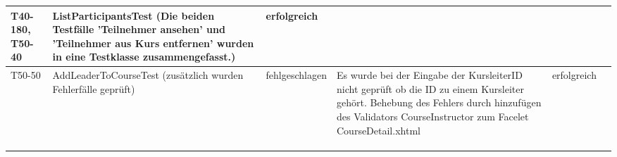 \begin{landscape}
\begin{tabular}{|p{2.0cm} |p{5.0cm}|p{3.0cm}|p{5.0cm}|p{4.0cm}|p{4.0cm}|}
			
			\hline  T40-180, T50-40  & ListParticipantsTest (Die beiden Testfälle 'Teilnehmer ansehen' und 'Teilnehmer aus Kurs entfernen' wurden in eine Testklasse zusammengefasst.) &     erfolgreich     &        &         &       \\
			\hline  T50-50  &  AddLeaderToCourseTest (zusätzlich wurden Fehlerfälle geprüft) &  fehlgeschlagen & Es wurde bei der Eingabe der KursleiterID nicht geprüft ob die ID zu einem Kursleiter gehört. Behebung des Fehlers durch hinzufügen des Validators CourseInstructor zum Facelet CourseDetail.xhtml  &  erfolgreich       &       \\
			\hline       &          &          &        &         &       \\
			\hline       &          &          &        &         &       \\
			\hline       &          &          &        &         &       \\
			\hline 
		\end{tabular} \ \\
		\ \\
	
\end{landscape}